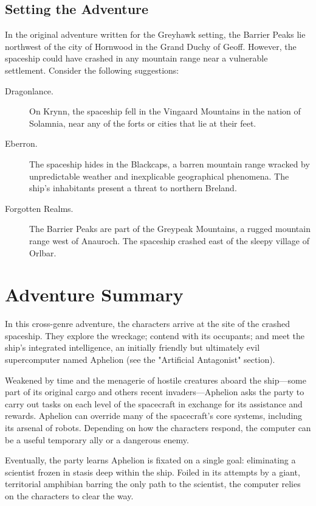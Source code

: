 \documentclass[10pt,a4paper,twoside,bg=print,twocolumn,openany,nodeprecatedcode]{dndbook}
\begin{document}
\subsection{Setting the Adventure}
In the original adventure written for the Greyhawk setting, the Barrier Peaks lie northwest of the city of Hornwood in the Grand Duchy of Geoff. However, the spaceship could have crashed in any mountain range near a vulnerable settlement. Consider the following suggestions:


\begin{description}
\item[Dragonlance.]
On Krynn, the spaceship fell in the Vingaard Mountains in the nation of Solamnia, near any of the forts or cities that lie at their feet.
\item[Eberron.]
The spaceship hides in the Blackcaps, a barren mountain range wracked by unpredictable weather and inexplicable geographical phenomena. The ship's inhabitants present a threat to northern Breland.
\item[Forgotten Realms.]
The Barrier Peaks are part of the Greypeak Mountains, a rugged mountain range west of Anauroch. The spaceship crashed east of the sleepy village of Orlbar.
\end{description}

\section{Adventure Summary}
In this cross-genre adventure, the characters arrive at the site of the crashed spaceship. They explore the wreckage; contend with its occupants; and meet the ship's integrated intelligence, an initially friendly but ultimately evil supercomputer named Aphelion (see the "Artificial Antagonist" section).

Weakened by time and the menagerie of hostile creatures aboard the ship—some part of its original cargo and others recent invaders—Aphelion asks the party to carry out tasks on each level of the spacecraft in exchange for its assistance and rewards. Aphelion can override many of the spacecraft's core systems, including its arsenal of robots. Depending on how the characters respond, the computer can be a useful temporary ally or a dangerous enemy.

Eventually, the party learns Aphelion is fixated on a single goal: eliminating a scientist frozen in stasis deep within the ship. Foiled in its attempts by a giant, territorial amphibian barring the only path to the scientist, the computer relies on the characters to clear the way.
\end{document}
